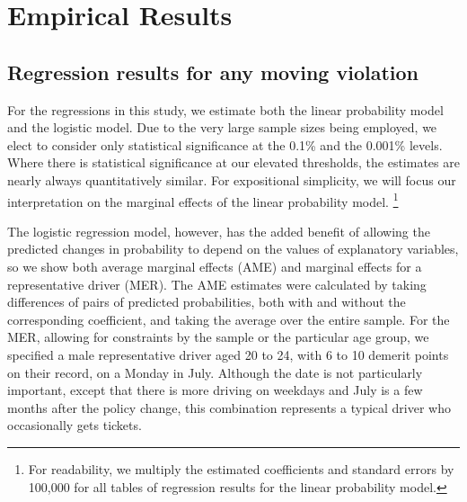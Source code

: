 \section{Empirical Results}
\label{sec:Empirical}


\subsection{Regression results for any moving violation}
\label{sec:Empirical_all}

For the regressions in this study, we estimate both the linear probability model and the logistic model. 
%
Due to the very large sample sizes being employed, 
we elect to consider only statistical significance at the 0.1\% and the 0.001\% levels. 
%
Where there is statistical significance at our elevated thresholds, 
the estimates are nearly always quantitatively similar. 
For expositional simplicity, we will focus our interpretation on 
the marginal effects of the linear probability model.%
\footnote{%
For readability, we multiply the estimated coefficients and standard errors by 100,000 
for all tables of regression results for the linear probability model.
% 
}






The logistic regression model, however, has the added benefit of 
allowing the predicted changes in probability to depend on
the values of explanatory variables, 
so we show both average marginal effects (AME)
and marginal effects for a representative driver (MER). 
% 
The AME estimates were calculated by taking differences of pairs of 
predicted probabilities, both with and without the corresponding coefficient,
and taking the average over the entire sample. 
%
For the MER, 
allowing for constraints by the sample or the particular age group, 
we specified a male representative driver aged 20 to 24, 
with 6 to 10 demerit points on their record, 
on a Monday in July.
Although the date is not particularly important, 
except that there is more driving on weekdays 
and July is a few months after the policy change, 
this combination represents a typical driver who occasionally
gets tickets. 



